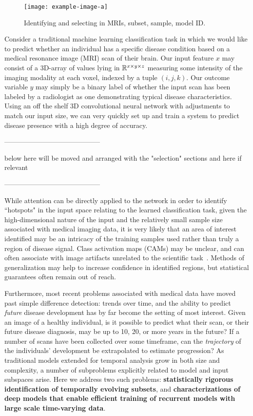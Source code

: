 \begin{figure}
    \centering
    \texttt{[image: example-image-a]}
    \caption[A simple subset selection example]{\color{red} Identifying and selecting in MRIs, subset, sample, model ID.}
\end{figure}

Consider a traditional machine learning classification task in which we would like to predict whether an individual has a specific disease condition based on a medical resonance image (MRI) scan of their brain. Our input feature $x$ may consist of a 3D-array of values lying in $\mathbb{R}^{x\times y\times z}$ measuring some intensity of the imaging modality at each voxel, indexed by a tuple $(i,j,k)$.
Our outcome variable $y$ may simply be a binary label of whether the input scan has been labeled by a radiologist as one demonstrating typical disease characteristics.
Using an off the shelf 3D convolutional neural network with adjustments to match our input size, we can very quickly set up and train a system to predict disease presence with a high degree of accuracy.

------------------------------------------

below here will be moved and arranged with the "selection" sections and here if relevant

------------------------------------------

While attention can be directly applied to the network in order to identify ``hotspots" in the input space relating to the learned classification task, 
given the high-dimensional nature of the input
and the relatively small sample size 
associated with medical imaging data, 
it is very likely that an area of interest identified
may be an intricacy of the training samples used rather than truly a region of disease signal.
Class activation maps (CAMs) may be unclear, and can often associate with image artifacts unrelated to the scientific task~\citep{adebayo2018sanity}.
Methods of generalization may help to increase confidence in identified regions, but statistical guarantees often remain out of reach.

Furthermore, most recent problems associated with medical data have moved past simple difference detection: trends over time, and the ability to predict {\em future} disease development has by far become the setting of most interest.
Given an image of a healthy individual, is it possible to predict what their scan, or their future disease diagnosis, may be up to 10, 20, or more years in the future?
If a number of scans have been collected over some timeframe, can the \textit{trajectory} of the individuals' development be extrapolated to estimate progression?
As traditional models extended for temporal analysis grow in both size and complexity,
a number of subproblems explicitly related to model and input subspaces arise. Here we address two such problems: \textbf{statistically rigorous identification of temporally evolving subsets}, and \textbf{characterizations of deep models that enable efficient training of recurrent models with large scale time-varying data}.

